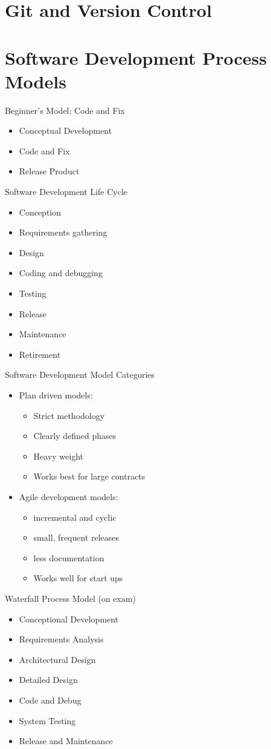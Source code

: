 \documentclass[12pt]{article}
\begin{document}
\section{Git and Version Control}
\section{Software Development Process Models}

Beginner's Model: Code and Fix
\begin{itemize}
    \item Conceptual Development
    \item Code and Fix
    \item Release Product
\end{itemize}

Software Development Life Cycle
\begin{itemize}
    \item Conception
    \item Requirements gathering
    \item Design
    \item Coding and debugging
    \item Testing
    \item Release
    \item Maintenance
    \item Retirement
\end{itemize}

Software Development Model Categories
\begin{itemize}
    \item Plan driven models:
    \begin{itemize}
        \item Strict methodology
        \item Clearly defined phases
        \item Heavy weight
        \item Works best for large contracts
    \end{itemize}
    \item Agile development models:
    \begin{itemize}
        \item incremental and cyclic
        \item small, frequent releases
        \item less documentation
        \item Works well for start ups
    \end{itemize}
\end{itemize}

Waterfall Process Model (on exam)
\begin{itemize}
    \item Conceptional Development
    \item Requirements Analysis
    \item Architectural Design
    \item Detailed Design
    \item Code and Debug
    \item System Testing 
    \item Release and Maintenance
\end{itemize}
\end{document}
